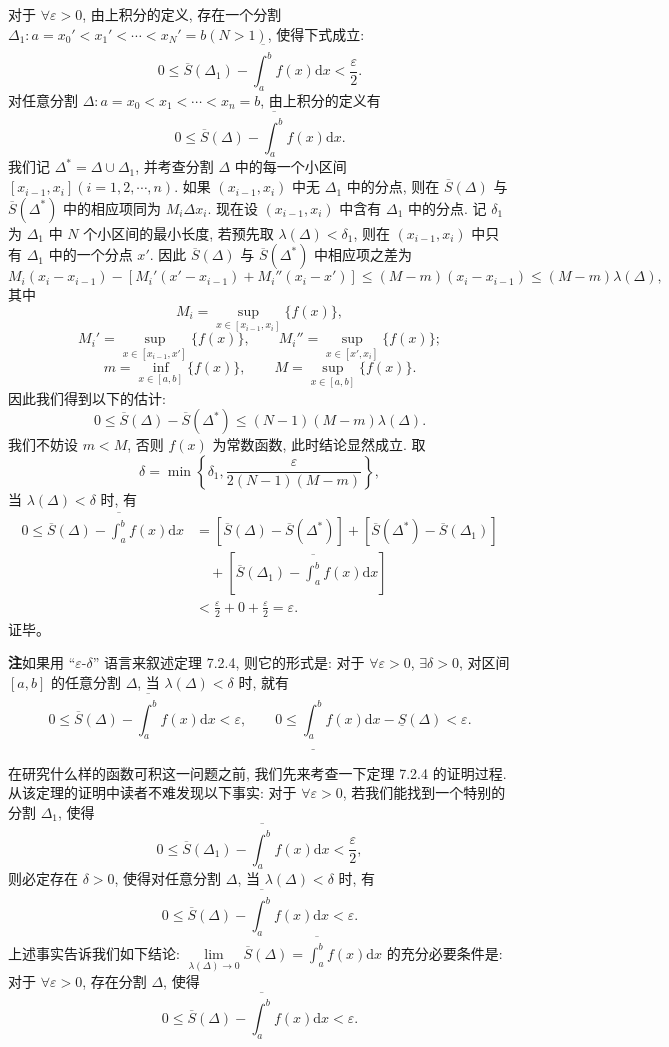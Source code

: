 \documentclass[UTF8,12pt,a4paper,fontset=fandol]{ctexart}
\begin{document}
对于 $\forall\varepsilon>0$, 由上积分的定义, 存在一个分割 $\Delta_1:a=x_0'<x_1'<\cdots<x_N'=b(N>1)$, 使得下式成立:
\[
  0\leq \overline S(\Delta_1)-\overline{\int_a^b} f(x)\mathrm dx<\frac{\varepsilon}{2}.
\]
对任意分割 $\Delta:a=x_0<x_1<\cdots<x_n=b$, 由上积分的定义有
\[
  0\leq \overline S(\Delta)-\overline{\int_a^b} f(x)\mathrm dx.
\]
我们记 $\Delta^*=\Delta\cup\Delta_1$, 并考查分割 $\Delta$ 中的每一个小区间 $[x_{i-1},x_i](i=1,2,\cdots,n)$. 如果 $(x_{i-1},x_i)$ 中无 $\Delta_1$ 中的分点, 则在 $\overline S(\Delta)$ 与 $\overline S(\Delta^*)$ 中的相应项同为 $M_i\Delta x_i$. 现在设 $(x_{i-1},x_i)$ 中含有 $\Delta_1$ 中的分点. 记 $\delta_1$ 为 $\Delta_1$ 中 $N$ 个小区间的最小长度, 若预先取 $\lambda(\Delta)<\delta_1$, 则在 $(x_{i-1},x_i)$ 中只有 $\Delta_1$ 中的一个分点 $x'$. 因此 $\overline S(\Delta)$ 与 $\overline S(\Delta^*)$ 中相应项之差为
\[
  M_i(x_i-x_{i-1})-[M_i'(x'-x_{i-1})+M_i''(x_i-x')]
  \leq (M-m)(x_i-x_{i-1})\leq (M-m)\lambda(\Delta),
\]
其中
\[
  M_i=\sup_{x\in[x_{i-1},x_i]}\{f(x)\},
\]
\[
  M_i'=\sup_{x\in[x_{i-1},x']}\{f(x)\},\qquad
  M_i''=\sup_{x\in[x',x_i]}\{f(x)\};
\]
\[
  m=\inf_{x\in[a,b]}\{f(x)\},\qquad M=\sup_{x\in[a,b]}\{f(x)\}.
\]
因此我们得到以下的估计:
\[
  0\leq \overline S(\Delta)-\overline S(\Delta^*)\leq (N-1)(M-m)\lambda(\Delta).
\]
我们不妨设 $m<M$, 否则 $f(x)$ 为常数函数, 此时结论显然成立. 取
\[
  \delta=\min\left\{\delta_1,\frac{\varepsilon}{2(N-1)(M-m)}\right\},
\]
当 $\lambda(\Delta)<\delta$ 时, 有
\[
\begin{aligned}
  0\leq \overline S(\Delta)-\overline{\int_a^b} f(x)\mathrm dx
  &=[\overline S(\Delta)-\overline S(\Delta^*)]+[\overline S(\Delta^*)-\overline S(\Delta_1)]\\
  &\quad+\left[\overline S(\Delta_1)-\overline{\int_a^b} f(x)\mathrm dx\right]\\
  &<\frac{\varepsilon}{2}+0+\frac{\varepsilon}{2}=\varepsilon.
\end{aligned}
\]
证毕。

\noindent\textbf{注}\quad 如果用 ``$\varepsilon$-$\delta$'' 语言来叙述定理 7.2.4, 则它的形式是: 对于 $\forall\varepsilon>0$, $\exists\delta>0$, 对区间 $[a,b]$ 的任意分割 $\Delta$, 当 $\lambda(\Delta)<\delta$ 时, 就有
\[
  0\leq \overline S(\Delta)-\overline{\int_a^b} f(x)\mathrm dx<\varepsilon,\qquad
  0\leq \underline{\int_a^b} f(x)\mathrm dx-\underline S(\Delta)<\varepsilon.
\]

在研究什么样的函数可积这一问题之前, 我们先来考查一下定理 7.2.4 的证明过程. 从该定理的证明中读者不难发现以下事实: 对于 $\forall\varepsilon>0$, 若我们能找到一个特别的分割 $\Delta_1$, 使得
\[
  0\leq \overline S(\Delta_1)-\overline{\int_a^b} f(x)\mathrm dx<\frac{\varepsilon}{2},
\]
则必定存在 $\delta>0$, 使得对任意分割 $\Delta$, 当 $\lambda(\Delta)<\delta$ 时, 有
\[
  0\leq \overline S(\Delta)-\overline{\int_a^b} f(x)\mathrm dx<\varepsilon.
\]
上述事实告诉我们如下结论: $\lim\limits_{\lambda(\Delta)\to0}\overline S(\Delta)=\overline{\int_a^b} f(x)\mathrm dx$ 的充分必要条件是: 对于 $\forall\varepsilon>0$, 存在分割 $\Delta$, 使得
\[
  0\leq \overline S(\Delta)-\overline{\int_a^b} f(x)\mathrm dx<\varepsilon.
\]
\end{document}
